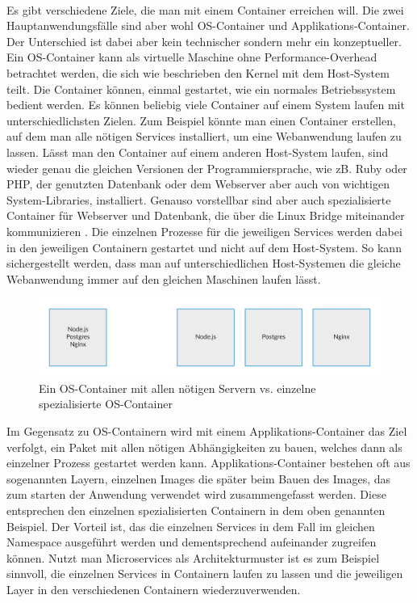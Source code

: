 \paragraph{}
Es gibt verschiedene Ziele, die man mit einem Container erreichen will. Die zwei Hauptanwendungsfälle sind aber wohl OS-Container und Applikations-Container. Der Unterschied ist dabei aber kein technischer sondern mehr ein konzeptueller.\\
Ein OS-Container kann als virtuelle Maschine ohne Performance-Overhead betrachtet werden, die sich wie beschrieben den Kernel mit dem Host-System teilt. Die Container können, einmal gestartet, wie ein normales Betriebssystem bedient werden. Es können beliebig viele Container auf einem System laufen mit unterschiedlichsten Zielen. Zum Beispiel könnte man einen Container erstellen, auf dem man alle nötigen Services installiert, um eine Webanwendung laufen zu lassen. Lässt man den Container auf einem anderen Host-System laufen, sind wieder genau die gleichen Versionen der Programmiersprache, wie zB. Ruby oder PHP, der genutzten Datenbank oder dem Webserver aber auch von wichtigen System-Libraries, installiert. Genauso vorstellbar sind aber auch spezialisierte Container für Webserver und Datenbank, die über die Linux Bridge miteinander kommunizieren \cite{ocvsac}. Die einzelnen Prozesse für die jeweiligen Services werden dabei in den jeweiligen Containern gestartet und nicht auf dem Host-System. So kann sichergestellt werden, dass man auf unterschiedlichen Host-Systemen die gleiche Webanwendung immer auf den gleichen Maschinen laufen lässt.

\begin{figure}[!ht]
  \centering
  \includegraphics[width=1\textwidth]{images/os-specialized-containers.png}
  \caption{Ein OS-Container mit allen nötigen Servern vs. einzelne spezialisierte OS-Container}
\end{figure}

Im Gegensatz zu OS-Containern wird mit einem Applikations-Container das Ziel verfolgt, ein Paket mit allen nötigen Abhängigkeiten zu bauen, welches dann als einzelner Prozess gestartet werden kann.
Applikations-Container bestehen oft aus sogenannten Layern, einzelnen Images die später beim Bauen des Images, das zum starten der Anwendung verwendet wird zusammengefasst werden. Diese entsprechen den einzelnen spezialisierten Containern in dem oben genannten Beispiel. Der Vorteil ist, das die einzelnen Services in dem Fall im gleichen Namespace ausgeführt werden und dementsprechend aufeinander zugreifen können. Nutzt man Microservices als Architekturmuster ist es zum Beispiel sinnvoll, die einzelnen Services in Containern laufen zu lassen und die jeweiligen Layer in den verschiedenen Containern wiederzuverwenden.

